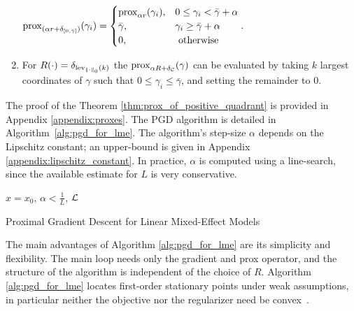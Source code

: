 \begin{theorem}
\begin{enumerate}
\(
{\mathrm{prox}}_{(\alpha r + \delta_{[0,{\bar{\gamma}}]})}(\gamma_i) 
    = \begin{cases} 
        {\mathrm{prox}}_{\alpha r}(\gamma_i), & 0 \leq \gamma_i < \bar\gamma + \alpha \\
        \bar\gamma, & \gamma_i \geq \bar\gamma + \alpha \\
        0, & \text{ otherwise} \end{cases}.
\)
    \item For $R(\cdot) = \delta_{{\mathrm{lev}_{\left\Vert \cdot\right\Vert_0}(k)}}$  %
    the ${\mathrm{prox}}_{\alpha R + \delta_{\mathcal{C}}}(\gamma)$ can be evaluated by taking $k$ largest coordinates of $\gamma$ such that $0 \leq \gamma_i \leq \bar\gamma$, and setting the 
    remainder to $0$.
    \end{enumerate}
\end{theorem}
The proof of the Theorem \ref{thm:prox_of_positive_quadrant} is provided in Appendix \ref{appendix:proxes}. 
The  PGD algorithm is detailed in Algorithm~\ref{alg:pgd_for_lme}.
{The algorithm's step-size $\alpha$ depends on the Lipschitz constant; an upper-bound is given in Appendix \ref{appendix:lipschitz_constant}. In practice, $\alpha$ is computed using a line-search, since the available estimate for $L$ is very conservative.}

\smallskip

\begin{algorithm}[H]
\SetAlgoLined
$x = x_0$, $\alpha < \frac{1}{L}$, $\operatorname{\mathcal{L}}$ \\
 \caption{\label{alg:pgd_for_lme}Proximal Gradient Descent for Linear Mixed-Effect Models}
\end{algorithm}
\medskip

\noindent

The main advantages of Algorithm \ref{alg:pgd_for_lme} are its simplicity and flexibility.
The main loop needs only the gradient and prox operator, and the structure of the algorithm is independent of the choice of $R$.
Algorithm \ref{alg:pgd_for_lme} locates first-order stationary points
under weak assumptions, in particular neither the objective nor the regularizer need be convex~\citep{AB17,attouch2013convergence}. 

